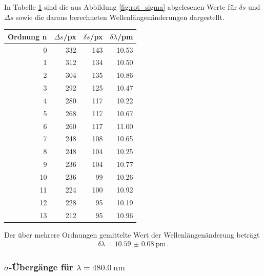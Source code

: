\documentclass[captions=tableheading]{scrartcl}
\begin{document}
\label{fig:rot_sigma}
\vspace{0.5cm}
In Tabelle \ref{tab:rotmessung} sind die aus Abbildung \ref{fig:rot_sigma} abgelesenen Werte für $\delta s$ und $\Delta s$ sowie die daraus berechneten Wellenlängenänderungen dargestellt.
\begin{table}[H]
	\centering
	\label{tab:rotmessung}
	\begin{tabular}{r r r r}
		\toprule
		Ordnung n & $\Delta s$/px & $\delta s$/px & $\delta \lambda$/pm \\
		\midrule
		0 & 332 & 143 & 10.53 \\
		1 & 312 & 134 & 10.50 \\
		2 & 304 & 135 & 10.86 \\
		3 & 292 & 125 & 10.47 \\
		4 & 280 & 117 & 10.22 \\
		5 & 268 & 117 & 10.67 \\
		6 & 260 & 117 & 11.00 \\
		7 & 248 & 108 & 10.65 \\
		8 & 248 & 104 & 10.25 \\
		9 & 236 & 104 & 10.77 \\
		10 & 236 & 99 & 10.26 \\
		11 & 224 & 100 & 10.92 \\
		12 & 228 & 95 & 10.19 \\
		13 & 212 & 95 & 10.96 \\
		\bottomrule
	\end{tabular}
\end{table}
Der über mehrere Ordnungen gemittelte Wert der Wellenlängenänderung beträgt
\begin{align}
\delta \lambda = \SI{10.59(8)}{\pico\metre}\,.
\end{align}

\subsubsection{$\sigma$-Übergänge für $\lambda=\SI{480.0}{\nano\metre}$}
\end{document}

